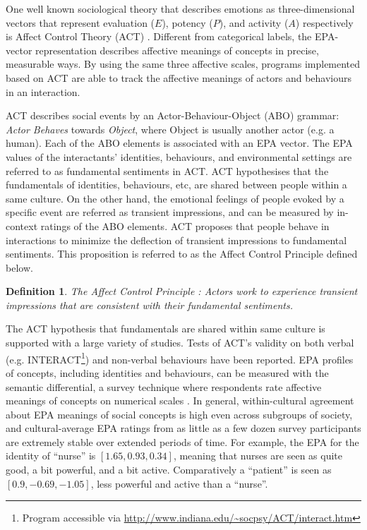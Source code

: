 One well known sociological theory that describes emotions as three-dimensional vectors that represent evaluation ($E$), potency ($P$), and activity ($A$) respectively is Affect Control Theory (ACT) \cite{robinson2006affect}. Different from categorical labels, the EPA-vector representation describes affective meanings of concepts in precise, measurable ways. By using the same three affective scales, programs implemented based on ACT are able to track the affective meanings of actors and behaviours in an interaction.

ACT describes social events by an Actor-Behaviour-Object (ABO) grammar: \textit{Actor Behaves} towards \textit{Object}, where Object is usually another actor (e.g. a human). Each of the ABO elements is associated with an EPA vector. The EPA values of the interactants' identities, behaviours, and environmental settings are referred to as fundamental sentiments in ACT. ACT hypothesises that the fundamentals of identities, behaviours, etc, are shared between people within a same culture. On the other hand, the emotional feelings of people evoked by a specific event are referred as transient impressions, and can be measured by in-context ratings of the ABO elements. ACT proposes that people behave in interactions to minimize the deflection of transient impressions to fundamental sentiments. This proposition is referred to as the Affect Control Principle defined below.

\newtheorem{def-act}{Definition}
\begin{def-act}
\label{def:act}
The Affect Control Principle \cite{robinson2006affect}: Actors work to experience transient impressions that are consistent with their fundamental sentiments.
\end{def-act}

The ACT hypothesis that fundamentals are shared within same culture is supported with a large variety of studies. Tests of ACT's validity on both verbal (e.g. INTERACT\footnote{Program accessible via \url{http://www.indiana.edu/~socpsy/ACT/interact.htm}}) and non-verbal behaviours \cite{schroder2013culture} have been reported. EPA profiles of concepts, including identities and behaviours, can be measured with the semantic differential, a survey technique where respondents rate affective meanings of concepts on numerical scales \cite{osgood1975cross}. In general, within-cultural agreement about EPA meanings of social concepts is high even across subgroups of society, and cultural-average EPA ratings from as little as a few dozen survey participants are extremely stable over extended periods of time. For example, the EPA for the identity of ``nurse'' is $[1.65, 0.93, 0.34]$, meaning that nurses are seen as quite good, a bit powerful, and a bit active. Comparatively a ``patient'' is seen as $[0.9, -0.69, -1.05]$, less powerful and active than a ``nurse''.

